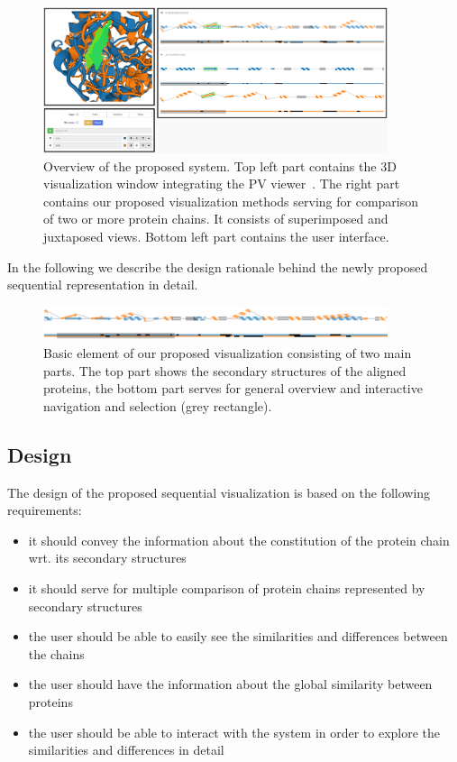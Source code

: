 \documentclass[twocolumn]{bmcart}%
\begin{document}
\begin{figure}[t]
  \centering
  \includegraphics[width=0.9\textwidth]{pics/flattening_design2.png}
  \caption{Overview of the proposed system. Top left part contains the 3D visualization window integrating the PV viewer~\cite{biasini2014}. The right part contains our proposed visualization methods serving for comparison of two or more protein chains. It consists of superimposed and juxtaposed views. Bottom left part contains the user interface.}
  \label{fig:design}
\end{figure}


In the following we describe the design rationale behind the newly proposed sequential representation in detail.

\begin{figure}[t!]
  \centering
  \includegraphics[width=0.9\textwidth]{pics/element2.png}
  \caption{Basic element of our proposed visualization consisting of two main parts. The top part shows the secondary structures of the aligned proteins, the bottom part serves for general overview and interactive navigation and selection (grey rectangle).}
  \label{fig:element}
\end{figure}

\subsection*{Design}
The design of the proposed sequential visualization is based on the following requirements:
\begin{itemize}
\item it should convey the information about the constitution of the protein chain wrt. its secondary structures
\item it should serve for multiple comparison of protein chains represented by secondary structures
\item the user should be able to easily see the similarities and differences between the chains
\item the user should have the information about the global similarity between proteins 
\item the user should be able to interact with the system in order to explore the similarities and differences in detail
\end{itemize}
\end{document}

